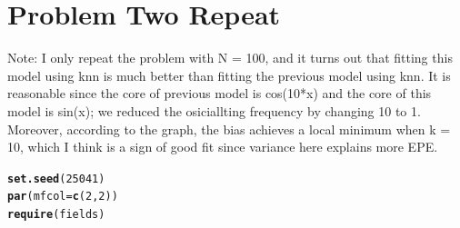 \documentclass{article}\usepackage[]{graphicx}\usepackage[]{color}
\makeatletter
\newcommand{\hlnum}[1]{\textcolor[rgb]{0.686,0.059,0.569}{#1}}%
\newcommand{\hlstd}[1]{\textcolor[rgb]{0.345,0.345,0.345}{#1}}%
\newcommand{\hlkwc}[1]{\textcolor[rgb]{0.333,0.667,0.333}{#1}}%
\newcommand{\hlkwd}[1]{\textcolor[rgb]{0.737,0.353,0.396}{\textbf{#1}}}%
\newenvironment{kframe}{%
 \def\at@end@of@kframe{}%
 \ifinner\ifhmode%
  \def\at@end@of@kframe{\end{minipage}}%
  \begin{minipage}{\columnwidth}%
 \fi\fi%
 \def\FrameCommand##1{\hskip\@totalleftmargin \hskip-\fboxsep
 \colorbox{shadecolor}{##1}\hskip-\fboxsep
     \hskip-\linewidth \hskip-\@totalleftmargin \hskip\columnwidth}%
 \MakeFramed {\advance\hsize-\width
   \@totalleftmargin\z@ \linewidth\hsize
   \@setminipage}}%
 {\par\unskip\endMakeFramed%
 \at@end@of@kframe}
\newenvironment{knitrout}{}{} %
\makeatother
\begin{document}
\section*{Problem Two Repeat} 

Note: I only repeat the problem with N = 100, and it turns out that fitting this model using knn is much better than fitting the previous model using knn. It is reasonable since the core of previous model is cos(10*x) and the core of this model is sin(x); we reduced the osiciallting frequency by changing 10 to 1. Moreover, according to the graph, the bias achieves a local minimum when k = 10, which I think is a sign of good fit since variance here explains more EPE. 

\begin{knitrout}
\color{fgcolor}\begin{kframe}
\begin{alltt}
\hlkwd{set.seed}\hlstd{(}\hlnum{25041}\hlstd{)}
\hlkwd{par}\hlstd{(}\hlkwc{mfcol} \hlstd{=} \hlkwd{c}\hlstd{(}\hlnum{2}\hlstd{,} \hlnum{2}\hlstd{))}
\hlkwd{require}\hlstd{(fields)}
\end{alltt}



\end{kframe}
\end{knitrout}
\end{document}
